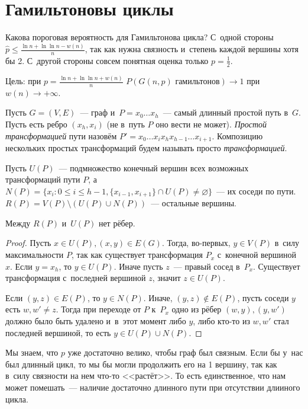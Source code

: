 \documentclass{article}
\begin{document}
\section{Гамильтоновы циклы}

Какова пороговая вероятность для Гамильтонова цикла? С~одной стороны $\hat p \le \frac{\ln n + \ln
\ln n - w(n)}{n}$, так как нужна связность и~степень каждой вершины хотя бы 2. С~другой стороны
совсем понятная оценка только $p = \frac{1}{2}$.

Цель: при $p = \frac{\ln n + \ln \ln n + w(n)}{n}$ $P(G(n, p) \text{ гамильтонов}) \rightarrow 1$
при $w(n) \rightarrow +\infty$.

\begin{definition}
	Пусть $G = (V, E)$~--- граф и~$P = x_0 \ldots x_h$~--- самый длинный простой путь в~$G$. Пусть
	есть ребро $(x_h, x_i)$ (не в~путь $P$ оно вести не может). \emph{Простой трансформацией} пути
	назовём $P' = x_0 \ldots x_i x_h x_{h-1} \ldots x_{i+1}$. Композицию нескольких простых
	трансформаций будем называть просто \emph{трансформацией}.
\end{definition}

Пусть $U(P)$~--- подмножество конечный вершин всех возможных трансформаций пути $P$, а~$N(P) =
\{x_i: 0 \le i \le h - 1, \{x_{i-1}, x_{i+1}\} \cap U(P) \ne \varnothing\}$~--- их соседи по пути.
$R(P) = V(P) \setminus (U(P) \cup N(P))$~--- остальные вершины.

\begin{lemma}[Поша]
	Между $R(P)$ и~$U(P)$ нет рёбер.
\end{lemma}
\begin{proof}
	Пусть $x \in U(P), (x, y) \in E(G)$. Тогда, во-первых, $y \in V(P)$ в~силу максимальности $P$, так
	как существует трансформация $P_x$ с~конечной вершиной $x$.
	Если $y = x_h$, то $y \in U(P)$. Иначе пусть $z$~--- правый сосед в~$P_x$. Существует
	трансформация с~последней вершиной $z$, значит $z \in U(P)$.

	Если $(y, z) \in E(P)$, то $y \in N(P)$. Иначе, $(y, z) \notin E(P)$, пусть соседи $y$ есть $w,
	w' \ne z$. Тогда при переходе от $P$ к~$P_x$ одно из рёбер $(w, y), (y, w')$ должно было быть
	удалено и~в~этот момент либо $y$, либо кто-то из $w, w'$ стал последней вершиной, то есть $y \in
	U(P) \cup N(P)$.
\end{proof}

Мы знаем, что $p$ уже достаточно велико, чтобы граф был связным. Если бы у~нас был длинный цикл, то
мы бы могли продолжить его на 1 вершину, так как в~силу связности на нем что-то <<растёт>>. То есть
единственное, что нам может помешать~--- наличие достаточно длинного пути при отсутствии длииного
цикла.
\end{document}
